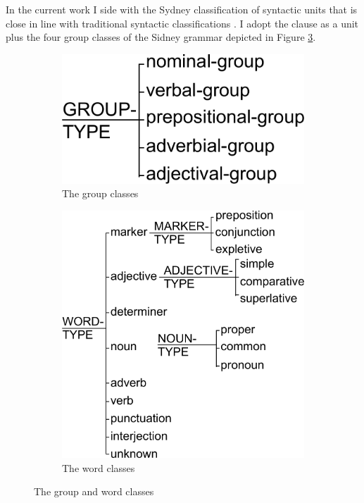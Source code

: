 In the current work I side with the Sydney classification of syntactic units that is close in line with traditional syntactic classifications \citep{Quirk1985}. I adopt the clause as a unit plus the four group classes of the Sidney grammar depicted in Figure \ref{fig:group-classes}. 

\begin{figure}[H]
	\centering
	\begin{subfigure}{.5\textwidth}
		\centering
		\includegraphics[width=0.57\linewidth]{Figures/SFL-grammar/group-classes.pdf}
		\caption{The group classes}
		\label{fig:group-classes-sub1}
	\end{subfigure}%
	\begin{subfigure}{.5\textwidth}
		\centering
		\includegraphics[width=0.9\linewidth]{Figures/SFL-grammar/word-classes.pdf}
		\caption{The word classes}
		\label{fig:group-classes-sub2}
	\end{subfigure}
	\caption{The group and word classes}
	\label{fig:group-classes}
\end{figure}

